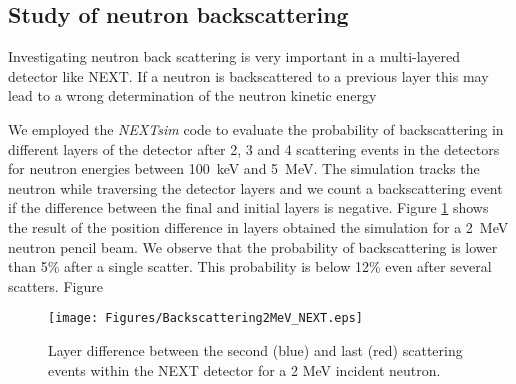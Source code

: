 \subsection{Study of neutron backscattering}

Investigating neutron back scattering is very important in a multi-layered detector like NEXT. If a neutron is backscattered to a previous layer this may lead to a wrong determination  of the neutron kinetic energy 

We employed the \emph{NEXTsim} code to evaluate the probability of backscattering in different layers of the detector after 2, 3 and 4 scattering events in the detectors for neutron energies between 100~keV and 5~MeV. The simulation tracks the neutron while traversing the detector layers and we count a backscattering event if the difference between the final and initial layers is negative. Figure  \ref{fig:backscattering} shows the result of the position difference in layers obtained the simulation for a 2~MeV neutron pencil beam. We observe that the probability of backscattering is lower than 5\% after a single scatter. This probability is below 12\% even after several scatters. Figure  

\begin{figure}[htb]
\centering
\texttt{[image: Figures/Backscattering2MeV\_NEXT.eps]}
\caption{Layer difference between the second (blue) and last (red) scattering events within the NEXT detector for a 2 MeV incident neutron.}
\label{fig:backscattering}
\end{figure}


%
%
%




